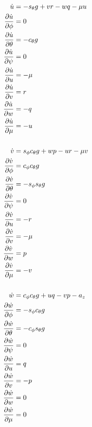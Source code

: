 \begin{align*}
  \dot{u} &= -s_\theta g + vr - wq - \mu u \\
  \frac{\partial \dot{u}}{\partial \phi} &= 0 \\
  \frac{\partial \dot{u}}{\partial \theta} &= -c_\theta g \\
  \frac{\partial \dot{u}}{\partial \psi} &= 0 \\
  \frac{\partial \dot{u}}{\partial u} &= -\mu \\
  \frac{\partial \dot{u}}{\partial v} &= r \\
  \frac{\partial \dot{u}}{\partial w} &= -q \\
  \frac{\partial \dot{u}}{\partial \mu} &= -u \\
  \\
  \dot{v} &= s_\phi c_\theta g + wp - ur - \mu v \\
  \frac{\partial \dot{v}}{\partial \phi} &= c_\phi c_\theta g \\
  \frac{\partial \dot{v}}{\partial \theta} &= -s_\phi s_\theta g \\
  \frac{\partial \dot{v}}{\partial \psi} &= 0 \\
  \frac{\partial \dot{v}}{\partial u} &= -r \\
  \frac{\partial \dot{v}}{\partial v} &= -\mu \\
  \frac{\partial \dot{v}}{\partial w} &= p \\
  \frac{\partial \dot{v}}{\partial \mu} &= -v \\
  \\
  \dot{w} &= c_\phi c_\theta g + uq - vp - a_z \\
  \frac{\partial \dot{w}}{\partial \phi} &= -s_\phi c_\theta g \\
  \frac{\partial \dot{w}}{\partial \theta} &= -c_\phi s_\theta g \\
  \frac{\partial \dot{w}}{\partial \psi} &= 0 \\
  \frac{\partial \dot{w}}{\partial u} &= q \\
  \frac{\partial \dot{w}}{\partial v} &= -p \\
  \frac{\partial \dot{w}}{\partial w} &= 0 \\
  \frac{\partial \dot{w}}{\partial \mu} &= 0 \\
\end{align*}

